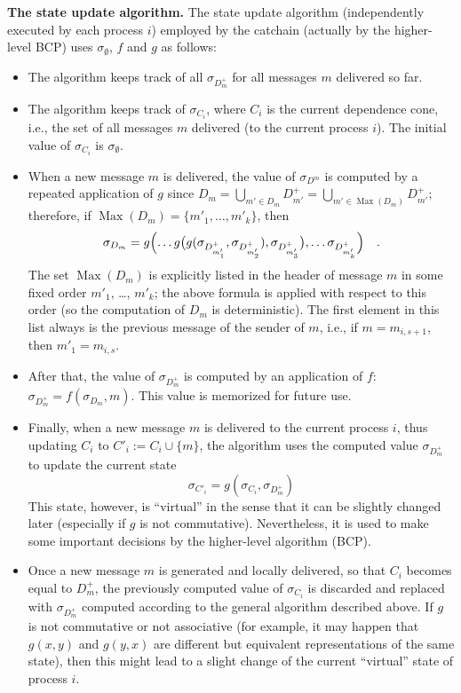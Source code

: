 \documentclass[12pt,oneside]{article}
\def\makepoint#1{\medbreak\noindent{\bf #1.\ }}
\def\nxsubpoint{\refstepcounter{subsubsection}%
  \smallbreak\makepoint{\thesubsubsection}}
\def\emb#1{\textbf{#1.}}
\def\Max{\operatorname{Max}}
\begin{document}
\nxsubpoint\emb{The state update algorithm}
The state update algorithm (independently executed by each process $i$) employed by the catchain (actually by the higher-level BCP) uses $\sigma_\emptyset$, $f$ and $g$ as follows:
\begin{itemize}
\item The algorithm keeps track of all $\sigma_{D^+_m}$ for all messages $m$ delivered so far.
\item The algorithm keeps track of $\sigma_{C_i}$, where $C_i$ is the current dependence cone, i.e., the set of all messages $m$ delivered (to the current process $i$). The initial value of $\sigma_{C_i}$ is $\sigma_\emptyset$.
\item When a new message $m$ is delivered, the value of $\sigma_{D^m}$ is computed by a repeated application of $g$ since $D_m=\bigcup_{m'\in D_m}D^+_{m'}=\bigcup_{m'\in\Max(D_m)}D^+_{m'}$; therefore, if $\Max(D_m)=\{m'_1,\ldots,m'_k\}$, then
  \begin{equation}\label{eq:merge.many}
    \sigma_{D_m}=g\Bigl(\ldots g\bigl(g(\sigma_{D^+_{m'_1}},\sigma_{D^+_{m'_2}}),\sigma_{D^+_{m'_3}}\bigr),\ldots \sigma_{D^+_{m'_k}}\Bigr)\quad.
  \end{equation}
The set $\Max(D_m)$ is explicitly listed in the header of message $m$ in some fixed order $m'_1$, \dots, $m'_k$; the above formula is applied with respect to this order (so the computation of $D_m$ is deterministic). The first element in this list always is the previous message of the sender of $m$, i.e., if $m=m_{i,s+1}$, then $m'_1=m_{i,s}$.
\item After that, the value of $\sigma_{D^+_m}$ is computed by an application of $f$: $\sigma_{D^+_m}=f(\sigma_{D_m},m)$. This value is memorized for future use.
\item Finally, when a new message $m$ is delivered to the current process $i$, thus updating $C_i$ to $C'_i:=C_i\cup\{m\}$, the algorithm uses the computed value $\sigma_{D^+_m}$ to update the current state
  \begin{equation}
    \sigma_{C'_i}=g(\sigma_{C_i},\sigma_{D^+_m})
  \end{equation}
  This state, however, is ``virtual'' in the sense that it can be slightly changed later (especially if $g$ is not commutative). Nevertheless, it is used to make some important decisions by the higher-level algorithm (BCP).
\item Once a new message $m$ is generated and locally delivered, so that $C_i$ becomes equal to $D^+_m$, the previously computed value of $\sigma_{C_i}$ is discarded and replaced with $\sigma_{D^+_m}$ computed according to the general algorithm described above. If $g$ is not commutative or not associative (for example, it may happen that $g(x,y)$ and $g(y,x)$ are different but equivalent representations of the same state), then this might lead to a slight change of the current ``virtual'' state of process $i$.

\end{itemize}
\end{document}
